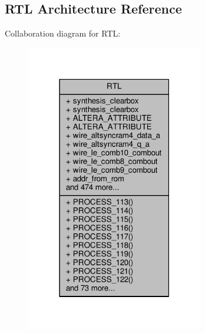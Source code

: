 \subsection{R\+TL Architecture Reference}
\label{classpll__reconfig__module__pllrcfg__ok11_1_1RTL}


Collaboration diagram for R\+TL\+:\nopagebreak
\begin{figure}[H]
\begin{center}
\leavevmode
\includegraphics[width=219pt]{d7/da7/classpll__reconfig__module__pllrcfg__ok11_1_1RTL__coll__graph}
\end{center}
\end{figure}
